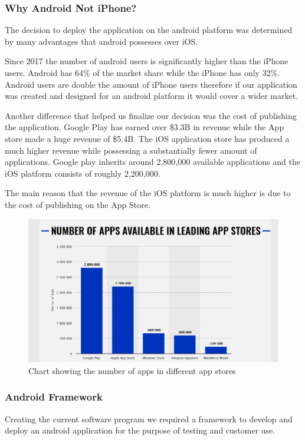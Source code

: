 \documentclass[a4paper,12pt]{report}
\begin{document}
\subsubsection{Why Android Not iPhone?}
The decision to deploy the application on the android platform was determined by many advantages that android possesses over iOS.

Since 2017 the number of android users is significantly higher than the iPhone users. Android has 64\% of the market share while the iPhone has only 32\%.
Android users are double the amount of iPhone users therefore if our application was created and designed for an android platform it would cover a wider market.

Another difference that helped us finalize our decision was the cost of publishing the application. Google Play has earned over \$3.3B in revenue while the App store made a huge revenue of \$5.4B. The iOS application store has produced a much higher revenue while possessing a substantially fewer amount of applications. Google play inherits around 2,800,000 available applications and the iOS platform consists of roughly 2,200,000.  

The main reason that the revenue of the iOS platform is much higher is due to the cost of publishing on the App Store.\cite{android&iOS}

\begin{figure}[h]
    \begin{center}
    \includegraphics[scale=.5]{images/androidvsios.png}
    \caption{Chart showing the number of apps in different app stores}
    \label{fig:numberOfApp}
    \end{center}
\end{figure}

\subsubsection{Android Framework}
Creating the current software program we required a framework to develop and deploy an android application for the purpose of testing and customer use.
\end{document}
